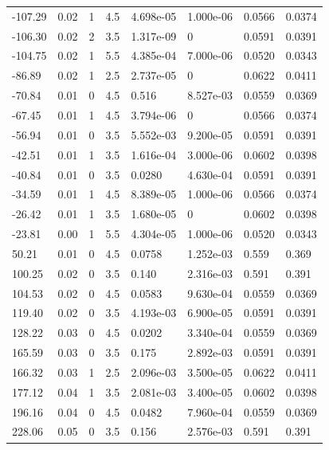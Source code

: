 \documentclass[preview]{standalone}
\begin{document}
{{\begin{tabular}{L{1.2cm}C{1.2cm} C{0.3cm}C{0.5cm} C{1.4cm}C{1.4cm} C{1.4cm}C{1.4cm}}
  -107.29  &  0.02  & 1     & 4.5 &  4.698e-05  & 1.000e-06  & 0.0566 &  0.0374   \\ 
  -106.30  &  0.02  & 2     & 3.5 &  1.317e-09  & 0  & 0.0591 &  0.0391   \\ 
  -104.75  &  0.02  & 1     & 5.5 &  4.385e-04  & 7.000e-06  & 0.0520 &  0.0343   \\ 
  -86.89  &  0.02  & 1     & 2.5 &  2.737e-05  & 0  & 0.0622 &  0.0411   \\ 
  -70.84  &  0.01  & 0     & 4.5 &  0.516  & 8.527e-03  & 0.0559 &  0.0369   \\ 
  -67.45  &  0.01  & 1     & 4.5 &  3.794e-06  & 0  & 0.0566 &  0.0374   \\ 
  -56.94  &  0.01  & 0     & 3.5 &  5.552e-03  & 9.200e-05  & 0.0591 &  0.0391   \\ 
  -42.51  &  0.01  & 1     & 3.5 &  1.616e-04  & 3.000e-06  & 0.0602 &  0.0398   \\ 
  -40.84  &  0.01  & 0     & 3.5 &  0.0280  & 4.630e-04  & 0.0591 &  0.0391   \\ 
  -34.59  &  0.01  & 1     & 4.5 &  8.389e-05  & 1.000e-06  & 0.0566 &  0.0374   \\ 
  -26.42  &  0.01  & 1     & 3.5 &  1.680e-05  & 0  & 0.0602 &  0.0398   \\ 
  -23.81  &  0.00  & 1     & 5.5 &  4.304e-05  & 1.000e-06  & 0.0520 &  0.0343   \\ 
  50.21  &  0.01  & 0     & 4.5 &  0.0758  & 1.252e-03  & 0.559 &  0.369   \\ 
  100.25  &  0.02  & 0     & 3.5 &  0.140  & 2.316e-03  & 0.591 &  0.391   \\ 
  104.53  &  0.02  & 0     & 4.5 &  0.0583  & 9.630e-04  & 0.0559 &  0.0369   \\ 
  119.40  &  0.02  & 0     & 3.5 &  4.193e-03  & 6.900e-05  & 0.0591 &  0.0391   \\ 
  128.22  &  0.03  & 0     & 4.5 &  0.0202  & 3.340e-04  & 0.0559 &  0.0369   \\ 
  165.59  &  0.03  & 0     & 3.5 &  0.175  & 2.892e-03  & 0.0591 &  0.0391   \\ 
  166.32  &  0.03  & 1     & 2.5 &  2.096e-03  & 3.500e-05  & 0.0622 &  0.0411   \\ 
  177.12  &  0.04  & 1     & 3.5 &  2.081e-03  & 3.400e-05  & 0.0602 &  0.0398   \\ 
  196.16  &  0.04  & 0     & 4.5 &  0.0482  & 7.960e-04  & 0.0559 &  0.0369   \\ 
  228.06  &  0.05  & 0     & 3.5 &  0.156  & 2.576e-03  & 0.591 &  0.391   \\ 

\end{tabular}}}
\end{document}
